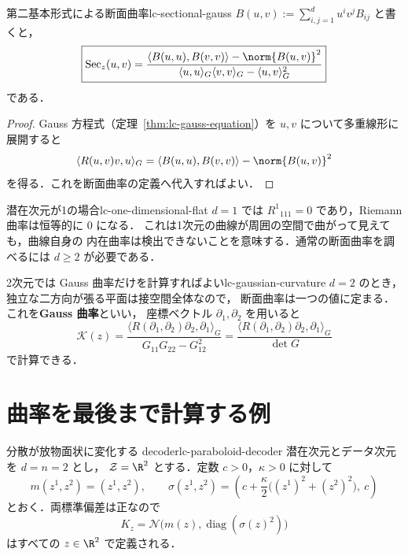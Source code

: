\begin{corollary}{第二基本形式による断面曲率}{lc-sectional-gauss}
  $B(u,v):=\sum_{i,j=1}^du^iv^jB_{ij}$ と書くと，
  \[
    \boxed{
      \operatorname{Sec}_z(u,v)
      =\frac{
        \langle B(u,u),B(v,v)\rangle-\norm{B(u,v)}^2
      }{
        \langle u,u\rangle_G\langle v,v\rangle_G
        -\langle u,v\rangle_G^2
      }
    }
  \]
  である．
\end{corollary}

\begin{proof}
  Gauss 方程式（定理~\ref{thm:lc-gauss-equation}）を
  $u,v$ について多重線形に展開すると
  \[
    \langle R(u,v)v,u\rangle_G
    =\langle B(u,u),B(v,v)\rangle-\norm{B(u,v)}^2
  \]
  を得る．これを断面曲率の定義へ代入すればよい．
\end{proof}

\begin{remark}{潜在次元が1の場合}{lc-one-dimensional-flat}
  $d=1$ では $R^1{}_{111}=0$ であり，Riemann 曲率は恒等的に $0$ になる．
  これは1次元の曲線が周囲の空間で曲がって見えても，曲線自身の
  内在曲率は検出できないことを意味する．通常の断面曲率を調べるには
  $d\geq2$ が必要である．
\end{remark}

\begin{remark}{2次元では Gauss 曲率だけを計算すればよい}{lc-gaussian-curvature}
  $d=2$ のとき，独立な二方向が張る平面は接空間全体なので，
  断面曲率は一つの値に定まる．これを\textbf{Gauss 曲率}といい，
  座標ベクトル $\partial_1,\partial_2$ を用いると
  \[
    \mathcal{K}(z)
    =\frac{
      \langle R(\partial_1,\partial_2)\partial_2,\partial_1\rangle_G
    }{
      G_{11}G_{22}-G_{12}^2
    }
    =\frac{
      \langle R(\partial_1,\partial_2)\partial_2,\partial_1\rangle_G
    }{\det G}
  \]
  で計算できる．
\end{remark}

\section{曲率を最後まで計算する例}
\label{sec:lc-paraboloid-example}

\begin{example}{分散が放物面状に変化する decoder}{lc-paraboloid-decoder}
  潜在次元とデータ次元を $d=n=2$ とし，
  $\mathcal{Z}=\R^2$ とする．定数 $c>0$，$\kappa>0$ に対して
  \[
    m(z^1,z^2)=(z^1,z^2),
    \qquad
    \sigma(z^1,z^2)
    =\left(
      c+\frac{\kappa}{2}\bigl((z^1)^2+(z^2)^2\bigr),\ c
    \right)
  \]
  とおく．両標準偏差は正なので
  \[
    K_z=\mathcal{N}\bigl(m(z),\operatorname{diag}(\sigma(z)^2)\bigr)
  \]
  はすべての $z\in\R^2$ で定義される．
\end{example}

